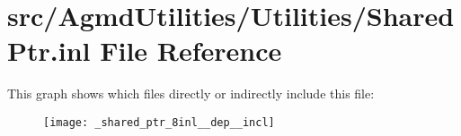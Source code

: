 \hypertarget{_shared_ptr_8inl}{\section{src/\+Agmd\+Utilities/\+Utilities/\+Shared\+Ptr.inl File Reference}
\label{_shared_ptr_8inl}
}
This graph shows which files directly or indirectly include this file\+:\nopagebreak
\begin{figure}[H]
\begin{center}
\leavevmode
\texttt{[image: \_shared\_ptr\_8inl\_\_dep\_\_incl]}
\end{center}
\end{figure}
